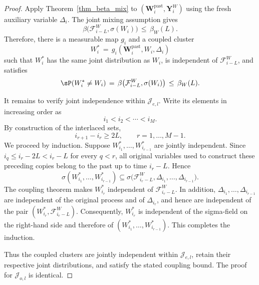 \documentclass[twoside,11pt]{article}
\newenvironment{revision}{\color{revisionred}}{}
\begin{document}
\begin{revision}
\begin{proof}
Apply Theorem~\ref{thm_beta_mix} to
$(\mathbf W_i^{\mathrm{past}},\mathbf Y_i^W)$ using the fresh auxiliary
variable $\Delta_i$. The joint mixing assumption gives
\[
\beta\bigl(\mathcal F_{i-L}^W,\sigma(W_i)\bigr)
\,\leq\,
\beta_W(L).
\]
Therefore, there is a measurable map $g_i$ and a coupled cluster
\[
W_i^*
\,=\,
g_i(\mathbf W_i^{\mathrm{past}},W_i,\Delta_i)
\]
such that $W_i^*$ has the same joint distribution as $W_i$, is
independent of $\mathcal F_{i-L}^W$, and satisfies
\[
\sP(W_i^*\neq W_i)
\,=\,
\beta\bigl(\mathcal F_{i-L}^W,\sigma(W_i)\bigr)
\,\leq\,
\beta_W(L).
\]

It remains to verify joint independence within $\mathcal J_{e,l}$.
Write its elements in increasing order as
\[
i_1<i_2<\cdots<i_M.
\]
By construction of the interlaced sets,
\[
i_{r+1}-i_r\geq2L,
\qquad r=1,\dots,M-1.
\]
We proceed by induction. Suppose
$W_{i_1}^*,\dots,W_{i_{r-1}}^*$ are jointly independent. Since
$i_q\leq i_r-2L<i_r-L$ for every $q<r$, all original variables used to
construct these preceding copies belong to the past up to time
$i_r-L$. Hence
\[
\sigma(W_{i_1}^*,\dots,W_{i_{r-1}}^*)
\subseteq
\sigma\bigl(
\mathcal F_{i_r-L}^W,
\Delta_{i_1},\dots,\Delta_{i_{r-1}}
\bigr).
\]
The coupling theorem makes $W_{i_r}^*$ independent of
$\mathcal F_{i_r-L}^W$. In addition,
$\Delta_{i_1},\dots,\Delta_{i_{r-1}}$ are independent of the original
process and of $\Delta_{i_r}$, and hence are independent of the pair
$(W_{i_r}^*,\mathcal F_{i_r-L}^W)$. Consequently, $W_{i_r}^*$ is
independent of the sigma-field on the right-hand side and therefore of
$(W_{i_1}^*,\dots,W_{i_{r-1}}^*)$. This completes the induction.

Thus the coupled clusters are jointly independent within
$\mathcal J_{e,l}$, retain their respective joint distributions, and
satisfy the stated coupling bound. The proof for
$\mathcal J_{o,l}$ is identical.
\end{proof}
\end{revision}






\vskip 0.2in
\begin{revision}

\end{revision}
\end{document}
